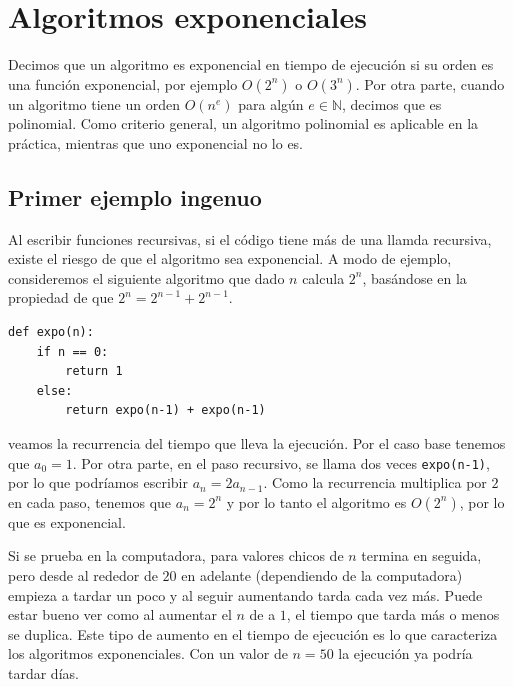\documentclass[a4paper, 12pt]{report}
\newcommand{\N}{\mathbb{N}}
\theoremstyle{definition}
\begin{document}
\section{Algoritmos exponenciales}

Decimos que un algoritmo es exponencial en tiempo de ejecución si su orden es una función exponencial, por ejemplo $O(2^n)$ o $O(3^n)$. Por otra parte, cuando un algoritmo tiene un orden $O(n^e)$ para algún $e\in\N$, decimos que es polinomial. Como criterio general, un algoritmo polinomial es aplicable en la práctica, mientras que uno exponencial no lo es.


\subsection*{Primer ejemplo ingenuo}

Al escribir funciones recursivas, si el código tiene más de una llamda recursiva, existe el riesgo de que el algoritmo sea exponencial. A modo de ejemplo, consideremos el siguiente algoritmo que dado $n$ calcula $2^n$, basándose en la propiedad de que $2^n = 2^{n-1}+2^{n-1}$.
\begin{verbatim}
def expo(n):
    if n == 0:
        return 1
    else:
        return expo(n-1) + expo(n-1)
\end{verbatim}
veamos la recurrencia del tiempo que lleva la ejecución. Por el caso base tenemos que $a_0 = 1$. Por otra parte, en el paso recursivo, se llama dos veces {\tt expo(n-1)}, por lo que podríamos escribir $a_n = 2a_{n-1}$. Como la recurrencia multiplica por $2$ en cada paso, tenemos que $a_n = 2^n$ y por lo tanto el algoritmo es $O(2^n)$, por lo que es exponencial.

Si se prueba en la computadora, para valores chicos de $n$ termina en seguida, pero desde al rededor de $20$ en adelante (dependiendo de la computadora) empieza a tardar un poco y al seguir aumentando tarda cada vez más. Puede estar bueno ver como al aumentar el $n$ de a $1$, el tiempo que tarda más o menos se duplica. Este tipo de aumento en el tiempo de ejecución es lo que caracteriza los algoritmos exponenciales. Con un valor de $n=50$ la ejecución ya podría tardar días.
\end{document}
